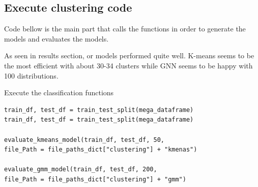\newpage

\newpage


\subsection{Execute clustering code}
Code bellow is the main part that calls the functions in order to generate the models and evaluates the models.

As seen in results section, or models performed quite well. K-means seems to be the most efficient with about 30-34 clusters while GNN seems to be happy with 100 distributions.
\begin{listing}[H]
\caption{Execute the classification functions}
\begin{verbatim}
train_df, test_df = train_test_split(mega_dataframe)
train_df, test_df = train_test_split(mega_dataframe)

evaluate_kmeans_model(train_df, test_df, 50, 
file_Path = file_paths_dict["clustering"] + "kmenas")

evaluate_gmm_model(train_df, test_df, 200, 
file_Path = file_paths_dict["clustering"] + "gmm")

\end{verbatim}
\end{listing}
